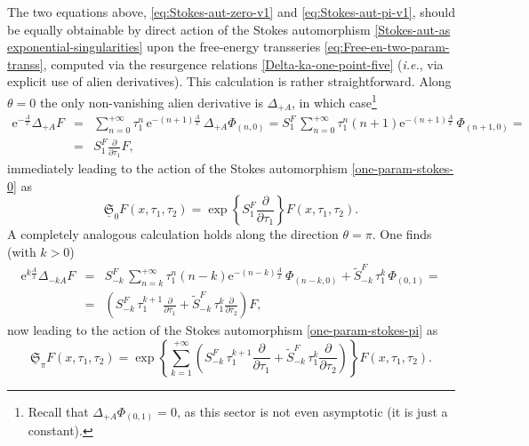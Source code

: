 \documentclass[11pt,a4paper]{article}
\newcommand{\rme}{{\mathrm{e}}}
\begin{document}
The two equations above, \eqref{eq:Stokes-aut-zero-v1} and \eqref{eq:Stokes-aut-pi-v1}, should be equally obtainable by direct action of the Stokes automorphism \eqref{Stokes-aut-as exponential-singularities} upon the free-energy transseries \eqref{eq:Free-en-two-param-transs}, computed via the resurgence relations \eqref{Delta-ka-one-point-five} (\textit{i.e.}, via explicit use of alien derivatives). This calculation is rather straightforward. Along $\theta=0$ the only non-vanishing alien derivative is $\Delta_{+A}$, in which case\footnote{Recall that $\Delta_{+A} \Phi_{(0,1)} = 0$, as this sector is not even asymptotic (it is just a constant).}
%
\begin{eqnarray}
\rme^{-\frac{A}{x}} \Delta_{+A} F &=& \sum_{n=0}^{+\infty} \tau_1^n\, \rme^{- \left( n+1 \right) \frac{A}{x}}\, \Delta_{+A} \Phi_{(n,0)} = S_{1}^{F}\, \sum_{n=0}^{+\infty} \tau_{1}^{n} \left( n+1 \right) \rme^{- \left( n+1 \right) \frac{A}{x}}\, \Phi_{(n+1,0)} = \nonumber \\
&=& S_{1}^{F} \frac{\partial}{\partial\tau_{1}} F,
\end{eqnarray}
%
\noindent
immediately leading to the action of the Stokes automorphism \eqref{one-param-stokes-0} as
%
\begin{equation}
\label{eq:Stokes-aut-zero-v2}
\underline{\mathfrak{S}}_{0} F (x, \tau_{1}, \tau_{2}) = \exp \left\{ S_{1}^F \frac{\partial}{\partial\tau_{1}} \right\} F (x, \tau_{1}, \tau_{2}).
\end{equation}
%
\noindent
A completely analogous calculation holds along the direction $\theta=\pi$. One finds (with $k>0$)
%
\begin{eqnarray}
\rme^{k\frac{A}{x}} \Delta_{-kA} F &=& S_{-k}^F\, \sum_{n=k}^{+\infty} \tau_1^n \left(n-k\right) \rme^{- \left( n-k \right) \frac{A}{x}}\, \Phi_{(n-k,0)} + \widetilde{S}_{-k}^F\, \tau_1^k\, \Phi_{(0,1)} = \nonumber \\
&=& \left( S_{-k}^{F}\, \tau_1^{k+1} \frac{\partial}{\partial\tau_1} + \widetilde{S}_{-k}^F\, \tau_1^k \frac{\partial}{\partial\tau_2} \right) F,
\label{Delta-kAF:generic}
\end{eqnarray}
%
\noindent
now leading to the action of the Stokes automorphism \eqref{one-param-stokes-pi} as
%
\begin{equation}
\label{eq:Stokes-aut-pi-v2}
\underline{\mathfrak{S}}_{\pi} F (x, \tau_{1}, \tau_{2}) = \exp \left\{ \sum_{k=1}^{+\infty} \left( S_{-k}^{F}\, \tau_1^{k+1} \frac{\partial}{\partial\tau_1} + \widetilde{S}_{-k}^F\, \tau_1^k \frac{\partial}{\partial\tau_2} \right) \right\} F (x, \tau_{1}, \tau_{2}).
\end{equation}
\end{document}
